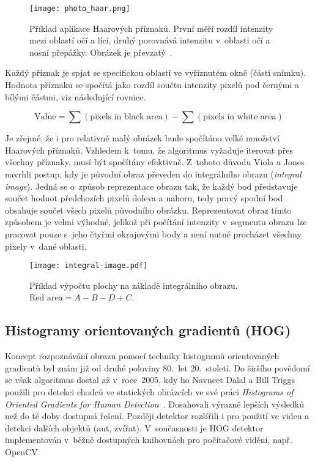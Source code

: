 \begin{figure}[H]
    \centering
    \texttt{[image: photo\_haar.png]}
    \caption[Příklad aplikace Haarových příznaků]{Příklad aplikace Haarových příznaků. První měří rozdíl intenzity mezi oblastí očí a líci, druhý porovnává intenzitu v~oblasti očí a nosní přepážky. Obrázek je převzatý~\cite{paperViolaJones}.}
    \label{fig_haar_feature_2}
\end{figure}

Každý příznak je spjat se specifickou oblastí ve vyříznutém okně (částí snímku). Hodnota příznaku se spočítá jako rozdíl součtu intenzity pixelů pod černými a bílými částmi, viz následující rovnice.

\begin{equation}
    \textrm{Value} = \sum (\textrm{pixels in black area}) - \sum (\textrm{pixels in white area})
    \label{eq_haar_feature}
\end{equation}

Je zřejmé, že i pro relativně malý obrázek bude spočítáno velké množství Haarových příznaků. Vzhledem k~tomu, že algoritmus vyžaduje iterovat přes všechny příznaky, musí být spočítány efektivně. Z~tohoto důvodu Viola a Jones navrhli postup, kdy je původní obraz převeden do integrálního obrazu (\textit{integral image}). Jedná se o~způsob reprezentace obrazu tak, že každý bod představuje součet hodnot předchozích pixelů doleva a nahoru, tedy pravý spodní bod obsahuje součet všech pixelů původního obrázku. Reprezentovat obraz tímto způsobem je velmi výhodné, jelikož při počítání intenzity v~segmentu obrazu lze pracovat pouze s~jeho čtyřmi okrajovými body a není nutné procházet všechny pixely v~dané oblasti.

\begin{figure}[H]
    \centering
    \texttt{[image: integral-image.pdf]}
    \caption[Výpočet plochy na základě integrálního obrazu]{Příklad výpočtu plochy na základě integrálního obrazu. $\textrm{Red area} = A - B - D + C$.}
    \label{fig_integral_image}
\end{figure}


\subsection*{Histogramy orientovaných gradientů (HOG)}

Koncept rozpoznávání obrazu pomocí techniky histogramů orientovaných gradientů byl znám již od druhé poloviny 80.~let 20.~století. Do širšího povědomí se však algoritmus dostal až v~roce~2005, kdy ho Navneet Dalal a Bill Triggs použili pro detekci chodců ve statických obrázcích ve své práci \textit{Histograms of Oriented Gradients for Human Detection}~\cite{paperDalalTriggs}. Dosahovali výrazně lepších výsledků než do té doby dostupná řešení. Později detektor rozšířili i pro použití ve videu a detekci dalších objektů (aut, zvířat). V~současnosti je HOG detektor implementován v~běžně dostupných knihovnách pro počítačové vidění, např. OpenCV.

